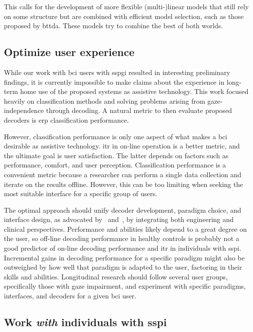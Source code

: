 This calls for the development of more flexible (multi-)linear models that still rely on some
structure but are combined with efficient model
selection, such as those proposed by \ac{bttda}.
These models try to combine the best of both worlds.

\subsection{Optimize user experience}
While our work with \ac{bci} users with \ac{sspgi} resulted in interesting
preliminary findings, it is currently impossible to make claims about the experience in long-term
home use of the proposed systems as assistive technology.
This work focused heavily on classification methods and solving problems
arising from gaze-independence through decoding.
A natural metric to then evaluate proposed decoders is \ac{erp} classification
performance.

However, classification performance is only one aspect of what makes a \ac{bci}
desirable as assistive technology.
\Ac{itr} in on-line operation is a better metric, and the ultimate goal
is user satisfaction.
The latter depends on factors such as performance, comfort, and user perception.
Classification performance is a convenient metric because a researcher can perform a single
data collection and iterate on the results offline.
However, this can be too limiting when seeking the most suitable interface
for a specific group of users.

The optimal approach should unify decoder development, paradigm choice, and interface
design, as advocated by~\textcite{Pan2022} and~\textcite{Fouad2020}, by integrating both
engineering and clinical perspectives.
Performance and abilities likely depend to a great degree on the user,
so off-line decoding performance in healthy controls is probably not a good
predictor of on-line decoding performance and \ac{itr} in individuals with
\ac{sspi}.
Incremental gains in decoding performance for a specific paradigm might
also be outweighed by how well that paradigm is adapted to the user, factoring in
their skills and abilities.
Longitudinal research should follow several user groups, specifically those with gaze
impairment, and experiment with specific paradigms, interfaces, and decoders for
a given \ac{bci} user.


\subsection{Work \emph{with} individuals with \acs{sspi}}

